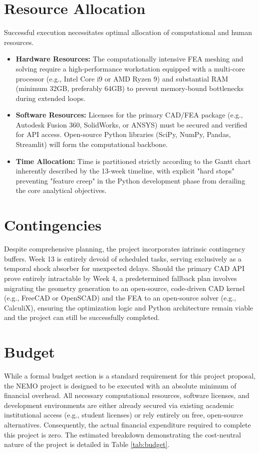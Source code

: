 \section{Resource Allocation}
Successful execution necessitates optimal allocation of computational and human resources.
\begin{itemize}
    \item \textbf{Hardware Resources:} The computationally intensive FEA meshing and solving require a high-performance workstation equipped with a multi-core processor (e.g., Intel Core i9 or AMD Ryzen 9) and substantial RAM (minimum 32GB, preferably 64GB) to prevent memory-bound bottlenecks during extended loops.
    \item \textbf{Software Resources:} Licenses for the primary CAD/FEA package (e.g., Autodesk Fusion 360, SolidWorks, or ANSYS) must be secured and verified for API access. Open-source Python libraries (SciPy, NumPy, Pandas, Streamlit) will form the computational backbone.
    \item \textbf{Time Allocation:} Time is partitioned strictly according to the Gantt chart inherently described by the 13-week timeline, with explicit "hard stops" preventing "feature creep" in the Python development phase from derailing the core analytical objectives.
\end{itemize}

\section{Contingencies}
Despite comprehensive planning, the project incorporates intrinsic contingency buffers. Week 13 is entirely devoid of scheduled tasks, serving exclusively as a temporal shock absorber for unexpected delays. Should the primary CAD API prove entirely intractable by Week 4, a predetermined fallback plan involves migrating the geometry generation to an open-source, code-driven CAD kernel (e.g., FreeCAD or OpenSCAD) and the FEA to an open-source solver (e.g., CalculiX), ensuring the optimization logic and Python architecture remain viable and the project can still be successfully completed.

\section{Budget}
While a formal budget section is a standard requirement for this project proposal, the NEMO project is designed to be executed with an absolute minimum of financial overhead. All necessary computational resources, software licenses, and development environments are either already secured via existing academic institutional access (e.g., student licenses) or rely entirely on free, open-source alternatives. Consequently, the actual financial expenditure required to complete this project is zero. The estimated breakdown demonstrating the cost-neutral nature of the project is detailed in Table \ref{tab:budget}.

